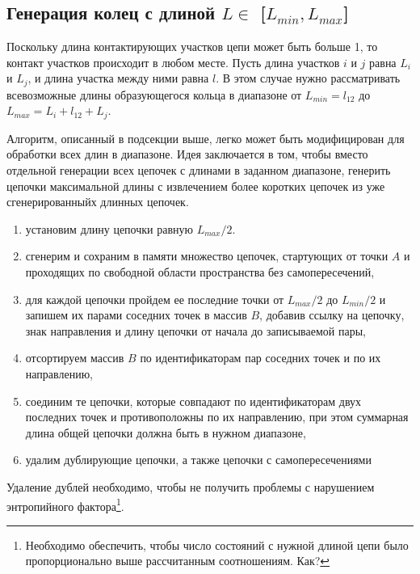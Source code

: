 \documentclass[tikz,a4paper]{scrartcl} %
\begin{document}
\subsection*{Генерация колец с длиной $L \in$ [$L_{min}, L_{max}$]}
Поскольку длина контактирующих участков цепи может быть больше 1, то контакт участков происходит в любом месте. Пусть длина участков $i$ и $j$ равна $L_i$ и $L_j$, и длина участка между ними равна $l$. В этом случае нужно рассматривать всевозможные длины образующегося кольца в диапазоне от $L_{min} = l_{12}$ до $L_{max} = L_i + l_{12} + L_j$. 

Алгоритм, описанный в подсекции выше, легко может быть модифицирован для обработки всех длин в диапазоне. Идея заключается в том, чтобы вместо отдельной генерации всех цепочек с длинами в заданном диапазоне, генерить цепочки максимальной длины с извлечением более коротких цепочек из уже сгенерированныйх длинных цепочек.

\begin{enumerate}
\item установим длину цепочки равную $L_{max}/2$.
\item сгенерим и сохраним в памяти множество цепочек, стартующих от точки $A$ и проходящих по свободной области пространства без самопересечений,
\item для каждой цепочки пройдем ее последние точки от $L_{max}/2$ до $L_{min}/2$ и запишем их парами соседних точек в массив $B$, добавив ссылку на цепочку, знак направления и длину цепочки от начала до записываемой пары,
\item отсортируем массив $B$ по идентификаторам пар соседних точек и по их направлению,
\item соединим те цепочки, которые совпадают по идентификаторам двух последних точек и противоположны по их направлению, при этом суммарная длина общей цепочки должна быть в нужном диапазоне,
\item удалим дублирующие цепочки, а также цепочки с самопересечениями
\end{enumerate}

Удаление дублей необходимо, чтобы не получить проблемы с нарушением энтропийного фактора\footnote{Необходимо обеспечить, чтобы число состояний с нужной длиной цепи было пропорционально выше рассчитанным соотношениям. Как?}. 
\end{document}
